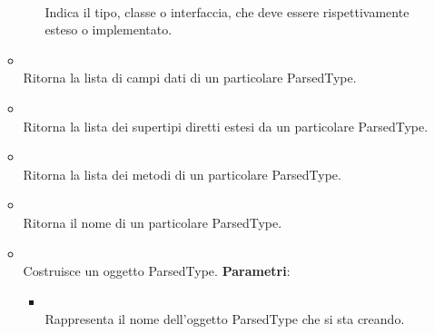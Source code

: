 \begin{itemize}
\begin{itemize}
\begin{itemize}
\\ Indica il tipo, classe o interfaccia, che deve essere rispettivamente esteso o implementato.
\end{itemize}
\item {}
\\ Ritorna la lista di campi dati di un particolare ParsedType.
\item {}
\\ Ritorna la lista dei supertipi diretti estesi da un particolare ParsedType.
\item {}
\\ Ritorna la lista dei metodi di un particolare ParsedType.
\item {}
\\ Ritorna il nome di un particolare ParsedType.
\item {}
\\ Costruisce un oggetto ParsedType.
\textbf{Parametri}:
\begin{itemize}
\item {}
\\ Rappresenta il nome dell'oggetto ParsedType che si sta creando.
\end{itemize}
\end{itemize}
\end{itemize}

